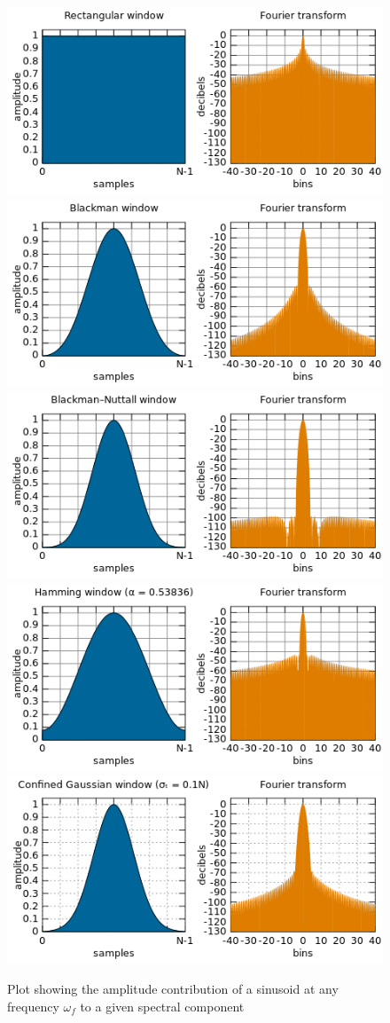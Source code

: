 \begin{figure}[h] \centering
\includegraphics[width=0.5 \textwidth]{Figures/Chapters/SignalAnalysis/Windows/rectangularWindow}
\includegraphics[width=0.5 \textwidth]{Figures/Chapters/SignalAnalysis/Windows/BlackmanWindow}
\includegraphics[width=0.5 \textwidth]{Figures/Chapters/SignalAnalysis/Windows/BlackmanNutallWindow}
\includegraphics[width=0.5 \textwidth]{Figures/Chapters/SignalAnalysis/Windows/HammingWindow}
\includegraphics[width=0.5 \textwidth]{Figures/Chapters/SignalAnalysis/Windows/ConfinedGaussianWindow}
  \caption{Plot showing the amplitude contribution of a sinusoid at any frequency $\omega_f$ to a given spectral component}
  \label{fig:amplitude-contribution-to-component-by-freq}
\end{figure}
